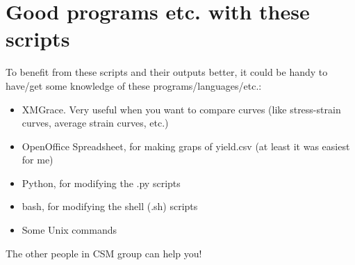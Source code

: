 \documentclass[a4paper]{article}
\begin{document}
\section{Good programs etc. with these scripts}

To benefit from these scripts and their outputs better, it could be handy to 
have/get some knowledge of these programs/languages/etc.:

\begin{itemize}
\item XMGrace. Very useful when you want to compare curves (like stress-strain 
curves, average strain curves, etc.)
\item OpenOffice Spreadsheet, for making graps of yield.csv (at least it was 
easiest for me)
\item Python, for modifying the .py scripts
\item bash, for modifying the shell (.sh) scripts
\item Some Unix commands
\end{itemize}

The other people in CSM group can help you!
\end{document}
